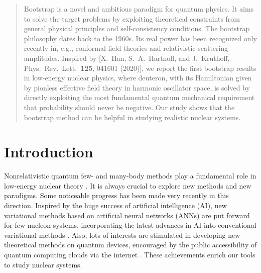 \documentclass[aps,prc,reprint,superscriptaddress,nofootinbib]{revtex4-2}
\begin{document}
\begin{abstract}

Bootstrap is a novel and ambitious paradigm for quantum physics.
It aims to solve the target problems by exploiting theoretical constraints from general physical principles and self-consistency conditions.
The bootstrap philosophy dates back to the 1960s.
Its real power has been recognized only recently in, e.g., conformal field theories and relativistic scattering amplitudes.
Inspired by [X.\ Han, S.\ A.\ Hartnoll, and J.\ Kruthoff, Phys.\ Rev.\ Lett.\ {\bf 125}, 041601 (2020)], 
we report the first bootstrap results in low-energy nuclear physics, where deuteron, with
its Hamiltonian given by pionless effective field theory in harmonic oscillator space, is solved by directly exploiting the most fundamental quantum mechanical requirement that probability should never be negative.
Our study shows that the bootstrap method can be helpful in studying realistic nuclear systems.

\end{abstract}


\maketitle

\section{Introduction}

Nonrelativistic quantum few- and many-body methods play a fundamental role in low-energy nuclear theory \cite{Gloeckle:1983,Ring:1980}.
It is always crucial to explore new methods and new paradigms.
Some noticeable progress has been made very recently in this direction.
Inspired by the huge success of artificial intelligence (AI),
new variational methods based on artificial neural networks (ANNs) are put forward for few-nucleon systems,
incorporating the latest advances in AI into conventional variational methods \cite{Keeble:2019bkv,Adams:2020aax,Gnech:2021wfn}.
Also, lots of interests are stimulated in developing new theoretical methods on quantum devices,
encouraged by the public accessibility of quantum computing clouds via the internet
\cite{Dumitrescu:2018njn,Klco:2018kyo,Roggero:2018hrn,Lee:2019zze,Roggero:2019myu,Lacroix:2020nhy,DiMatteo:2020dhe,Roggero:2020sgd,Cervia:2020fkk,RuizGuzman:2021cdj,Du:2021ctr,Siwach:2021tym,Stetcu:2021cbj,Baroni:2021xtl,Guzman:2021ede}.
These achievements enrich our tools to study nuclear systems.
\end{document}
